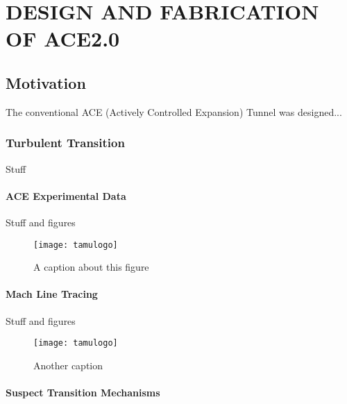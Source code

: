 %
%  
%



\chapter{DESIGN AND FABRICATION OF ACE2.0}

\section{Motivation}

The conventional ACE (Actively Controlled Expansion) Tunnel was designed...

\subsection{Turbulent Transition}

Stuff

\subsubsection{ACE Experimental Data}

Stuff and figures

\begin{figure}[ht]
    \centering
    \texttt{[image: tamulogo]}
    \caption{A caption about this figure}
\end{figure}

\subsubsection{Mach Line Tracing}

Stuff and figures

\begin{figure}[ht]
    \centering
    \texttt{[image: tamulogo]}
    \caption{Another caption}
\end{figure}


\subsubsection{Suspect Transition Mechanisms}

